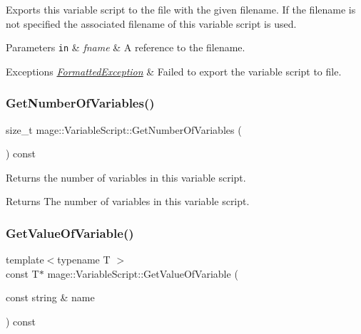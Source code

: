 Exports this variable script to the file with the given filename. If the filename is not specified the associated filename of this variable script is used.


\begin{DoxyParams}[1]{Parameters}
\mbox{\tt in}  & {\em fname} & A reference to the filename. \\
\hline
\end{DoxyParams}

\begin{DoxyExceptions}{Exceptions}
{\em \hyperlink{structmage_1_1_formatted_exception}{Formatted\+Exception}} & Failed to export the variable script to file. \\
\hline
\end{DoxyExceptions}
\hypertarget{classmage_1_1_variable_script_ad0bcb7dbb42f705f475c64feb1063fb4}{}\label{classmage_1_1_variable_script_ad0bcb7dbb42f705f475c64feb1063fb4} 
\subsubsection{\texorpdfstring{Get\+Number\+Of\+Variables()}{GetNumberOfVariables()}}
{\footnotesize\ttfamily size\+\_\+t mage\+::\+Variable\+Script\+::\+Get\+Number\+Of\+Variables (\begin{DoxyParamCaption}{ }\end{DoxyParamCaption}) const}

Returns the number of variables in this variable script.

\begin{DoxyReturn}{Returns}
The number of variables in this variable script. 
\end{DoxyReturn}
\hypertarget{classmage_1_1_variable_script_a231b83e1e32b882489ed90faa69f7137}{}\label{classmage_1_1_variable_script_a231b83e1e32b882489ed90faa69f7137} 
\subsubsection{\texorpdfstring{Get\+Value\+Of\+Variable()}{GetValueOfVariable()}}
{\footnotesize\ttfamily template$<$typename T $>$ \\
const T$\ast$ mage\+::\+Variable\+Script\+::\+Get\+Value\+Of\+Variable (\begin{DoxyParamCaption}\item[{const string \&}]{name }\end{DoxyParamCaption}) const}

